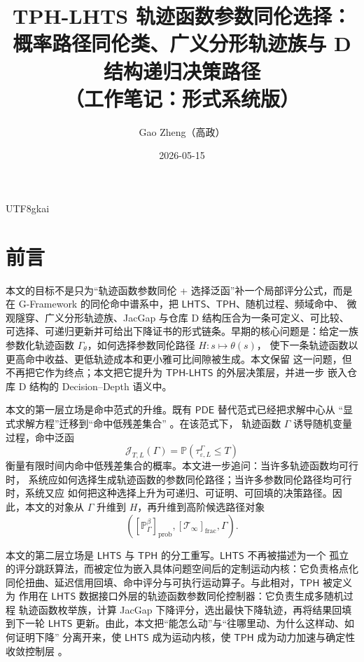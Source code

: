 \documentclass[12pt]{article}
\newcommand{\GFramework}{\textsf{G-Framework}}
\newcommand{\LHTS}{\ensuremath{\mathsf{LHTS}}}
\newcommand{\TPH}{\ensuremath{\mathsf{TPH}}}
\newcommand{\TPHLHTS}{\ensuremath{\mathsf{TPH\mbox{-}LHTS}}}
\newcommand{\PDE}{\ensuremath{\mathsf{PDE}}}
\newcommand{\Prob}{\mathbb P}
\begin{document}
\begin{CJK*}{UTF8}{gkai}

\title{TPH-LHTS 轨迹函数参数同伦选择：\\概率路径同伦类、广义分形轨迹族与 D 结构递归决策路径\\（工作笔记：形式系统版）}
\author{Gao Zheng（高政）}
\date{2026-05-15}
\maketitle

\section*{前言}

本文的目标不是只为“轨迹函数参数同伦 + 选择泛函”补一个局部评分公式，而是在
\GFramework{} 的同伦命中谱系中，把 \(\LHTS\)、\(\TPH\)、随机过程、频域命中、
微观隧穿、广义分形轨迹族、JacGap 与仓库 D 结构压合为一条可定义、可比较、
可选择、可递归更新并可给出下降证书的形式链条。早期的核心问题是：给定一族
参数化轨迹函数 \(\Gamma_\theta\)，如何选择参数同伦路径 \(H:s\mapsto\theta(s)\)，
使下一条轨迹函数以更高命中收益、更低轨迹成本和更小雅可比间隙被生成。本文保留
这一问题，但不再把它作为终点；本文把它提升为 \(\TPHLHTS\) 的外层决策层，并进一步
嵌入仓库 D 结构的 Decision--Depth 语义中。

本文的第一层立场是命中范式的升维。既有 \(\PDE\) 替代范式已经把求解中心从
“显式求解方程”迁移到“命中低残差集合” \cite{RepoTex55PDEParadigm}。在该范式下，
轨迹函数 \(\Gamma\) 诱导随机变量过程，命中泛函
\[
\mathcal J_{T,L}(\Gamma)
=
\Prob(\tau_{\varepsilon,L}^{\Gamma}\le T)
\]
衡量有限时间内命中低残差集合的概率。本文进一步追问：当许多轨迹函数均可行时，
系统应如何选择生成轨迹函数的参数同伦路径；当许多参数同伦路径均可行时，系统又应
如何把这种选择上升为可递归、可证明、可回填的决策路径。因此，本文的对象从
\(\Gamma\) 升维到 \(H\)，再升维到高阶候选路径对象
\[
\left(
[\mathbb P_\Gamma^\beta]_{\mathrm{prob}},
[\mathcal T_\infty]_{\mathrm{frac}},
\Gamma
\right).
\]

本文的第二层立场是 \(\LHTS\) 与 \(\TPH\) 的分工重写。\(\LHTS\) 不再被描述为一个
孤立的评分跳跃算法，而被定位为嵌入具体问题空间后的定制运动内核：它负责格点化
同伦扭曲、延迟信用回填、命中评分与可执行运动算子。与此相对，\(\TPH\) 被定义为
作用在 \(\LHTS\) 数据接口外层的轨迹函数参数同伦控制器：它负责生成多随机过程
轨迹函数枚举族，计算 JacGap 下降评分，选出最快下降轨迹，再将结果回填到下一轮
\(\LHTS\) 更新。由此，本文把“能怎么动”与“往哪里动、为什么这样动、如何证明下降”
分离开来，使 \(\LHTS\) 成为运动内核，使 \(\TPH\) 成为动力加速与确定性收敛控制层
\cite{RepoTex56LHTS}。


\end{CJK*}
\end{document}
